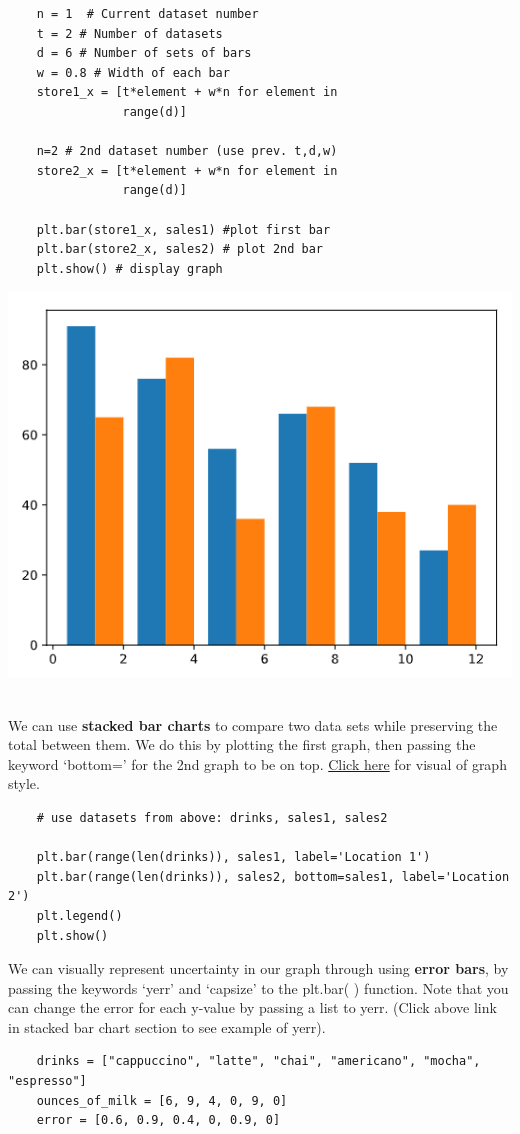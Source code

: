\documentclass[11pt, a4paper]{article}
\begin{document}
\begin{spacing}{1.1}
\begin{minipage}[c]{9.2cm}
\begin{lstlisting}
	n = 1  # Current dataset number
	t = 2 # Number of datasets
	d = 6 # Number of sets of bars
	w = 0.8 # Width of each bar
	store1_x = [t*element + w*n for element in 
	            range(d)]
	
	n=2 # 2nd dataset number (use prev. t,d,w)
	store2_x = [t*element + w*n for element in 
	            range(d)]
	
	plt.bar(store1_x, sales1) #plot first bar
	plt.bar(store2_x, sales2) # plot 2nd bar
	plt.show() # display graph \end{lstlisting}\vspace*{1mm}
	\end{minipage}
	\begin{minipage}[c]{8cm}
		\includegraphics[scale=.57]{sidebyside}
	\end{minipage} \vspace*{1mm} \\
	We can use \textbf{stacked bar charts} to compare two data sets while preserving the total between them. We do this by plotting the first graph, then passing the keyword `bottom=' for the 2nd graph to be on top. \href{https://matplotlib.org/3.1.1/gallery/lines_bars_and_markers/bar_stacked.html}{Click here} for visual of graph style.
	\begin{lstlisting}
	# use datasets from above: drinks, sales1, sales2 
	
	plt.bar(range(len(drinks)), sales1, label='Location 1')
	plt.bar(range(len(drinks)), sales2, bottom=sales1, label='Location 2')
	plt.legend()
	plt.show() \end{lstlisting}\vspace*{1mm}
	We can visually represent uncertainty in our graph through using \textbf{error bars}, by passing the keywords `yerr' and `capsize' to the plt.bar( ) function. Note that you can change the error for each y-value by passing a list to yerr. (Click above link in stacked bar chart section to see example of yerr).
	\begin{lstlisting}
	drinks = ["cappuccino", "latte", "chai", "americano", "mocha", "espresso"]
	ounces_of_milk = [6, 9, 4, 0, 9, 0]
	error = [0.6, 0.9, 0.4, 0, 0.9, 0]
	

\end{lstlisting}
\end{spacing}
\end{document}

